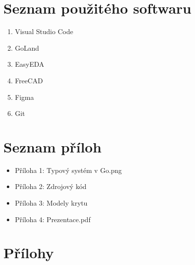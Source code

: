 \documentclass[czech,12pt,a4paper]{article}
\begin{document}
\clearpage

\section{Seznam použitého softwaru} \label{secSoftware}

\begin{enumerate}
	\item Visual Studio Code
	\item GoLand
	\item EasyEDA
	\item FreeCAD
	\item Figma
	\item Git
\end{enumerate}

\clearpage

\section{Seznam příloh} \label{secSeznamPriloh}

\begin{itemize}
	\item Příloha 1: Typový systém v Go.png
	\item Příloha 2: Zdrojový kód
	\item Příloha 3: Modely krytu
	\item Příloha 4: Prezentace.pdf
\end{itemize}

\clearpage

\section{Přílohy} \label{secPrilohy}
\end{document}
